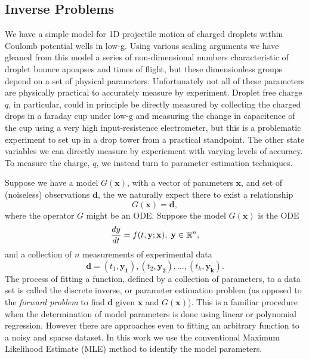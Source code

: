\documentclass[10pt,a4paper]{article}
\begin{document}
\subsection{Inverse Problems}
We have a simple model for 1D projectile motion of charged droplets within Coulomb potential wells in low-g. Using various scaling arguments we have gleaned from this model a series of non-dimensional numbers characteristic of droplet bounce apoapses and times of flight, but these dimensionless groups depend on a set of physical parameters. Unfortunately not all of these parameters are physically practical to accurately measure by experiment. Droplet free charge $q$, in particular, could in principle be directly measured by collecting the charged drops in a faraday cup under low-g and measuring the change in capacitence of the cup using a very high input-resistence electrometer, but this is a problematic experiment to set up in a drop tower from a practical standpoint. The other state variables we can directly measure by experiement with varying levels of accuracy. To measure the charge, $q$, we instead turn to parameter estimation techniques.  

Suppose we have a model $G(\mathbf{x})$, with a vector of parameters $\mathbf{x}$, and set of (noiseless) observations $\mathbf{d}$, the we naturally expect there to exist a relationship 
\[G(\mathbf{x}) = \mathbf{d} ,\]
where the operator $G$ might be an ODE. Suppose the model $G(\mathbf{x})$ is the ODE
\[ \frac{dy}{dt} = f(t, \mathbf{y}; \mathbf{x}), \hspace{1 mm}  \mathbf{y} \in \mathbb{R}^n, \]
and a collection of $n$ measurements of experimental data
\[ \mathbf{d} = \left( t_1, \mathbf{y_1} \right), 
\left( t_2, \mathbf{y_2} \right), ... ,
\left( t_k, \mathbf{y_k} \right).\]
The process of fitting a function, defined by a collection of parameters, to a data set is called the discrete inverse, or parameter estimation problem (as opposed to the \emph{forward problem} to find $\mathbf{d}$ given $\mathbf{x}$ and $G(\mathbf{x})$). This is a familiar procedure when the determination of model parameters is done using linear or polynomial regression. However there are approaches even to fitting an arbitrary function to a noisy and sparse dataset. In this work we use the conventional Maximum Likelihood Estimate (MLE) method to identify the model parameters.
\end{document}
